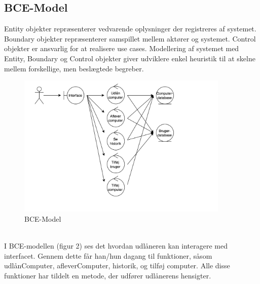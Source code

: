 \documentclass[a4paper]{article}
\begin{document}
\subsection{BCE-Model}
Entity objekter repræsenterer vedvarende oplysninger der registreres af systemet. Boundary objekter repræsenterer samspillet mellem aktører og systemet. Control objekter er ansvarlig for at realisere use cases. Modellering af systemet med Entity, Boundary og Control objekter giver udviklere enkel heuristik til at skelne mellem forskellige, men beslægtede begreber.\cite[p~171]{OOSE}
\begin{figure}[h!]
\includegraphics[width=0.9\textwidth]{BCE}
  \caption{BCE-Model}
  \centering
\end{figure}\\
I BCE-modellen (figur 2) ses det hvordan udlåneren kan interagere med interfacet. Gennem dette får han/hun dagang til funktioner, såsom udlånComputer, afleverComputer, historik, og tilføj computer. Alle disse funktioner har tildelt en metode, der udfører udlånerens hensigter.
\newpage
\end{document}

